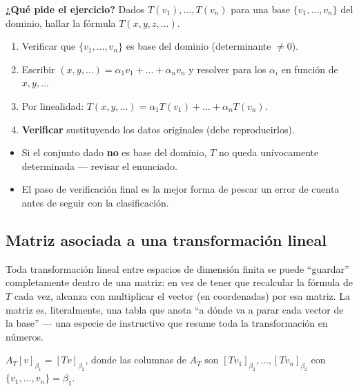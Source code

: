 \documentclass[11pt,a4paper]{article}
\newcommand{\qpide}[1]{\textbf{¿Qué pide el ejercicio?} #1\par}
\begin{document}
\qpide{Dados $T(v_1),\dots,T(v_n)$ para una base $\{v_1,\dots,v_n\}$ del dominio, hallar la
fórmula $T(x,y,z,\dots)$.}

\begin{proc}
\begin{enumerate}
    \item Verificar que $\{v_1,\dots,v_n\}$ es base del dominio (determinante $\neq0$).
    \item Escribir $(x,y,\dots)=\alpha_1v_1+\dots+\alpha_nv_n$ y resolver para los
    $\alpha_i$ en función de $x,y,\dots$
    \item Por linealidad: $T(x,y,\dots)=\alpha_1T(v_1)+\dots+\alpha_nT(v_n)$.
    \item \textbf{Verificar} sustituyendo los datos originales (debe reproducirlos).
\end{enumerate}
\end{proc}

\begin{atencion}
\begin{itemize}
    \item Si el conjunto dado \textbf{no} es base del dominio, $T$ no queda unívocamente
    determinada — revisar el enunciado.
    \item El paso de verificación final es la mejor forma de pescar un error de cuenta
    antes de seguir con la clasificación.
\end{itemize}
\end{atencion}

\subsection{Matriz asociada a una transformación lineal}

\begin{intuicion}
Toda transformación lineal entre espacios de dimensión finita se puede ``guardar''
completamente dentro de una matriz: en vez de tener que recalcular la fórmula de $T$ cada
vez, alcanza con multiplicar el vector (en coordenadas) por esa matriz. La matriz es,
literalmente, una tabla que anota ``a dónde va a parar cada vector de la base'' — una
especie de instructivo que resume toda la transformación en números.
\end{intuicion}

\begin{teoria}
$A_T[v]_{\beta_1}=[Tv]_{\beta_2}$, donde las columnas de $A_T$ son
$[Tv_1]_{\beta_2},\dots,[Tv_n]_{\beta_2}$ con $\{v_1,\dots,v_n\}=\beta_1$.
\end{teoria}
\end{document}
